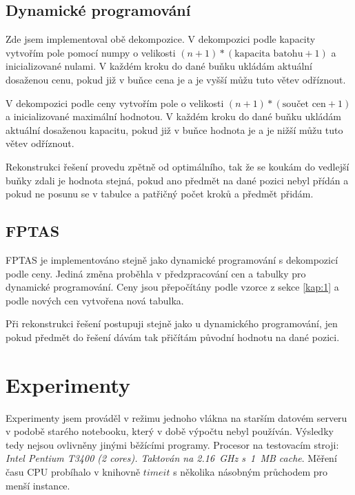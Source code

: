\documentclass[11pt]{article}
\begin{document}
\subsection{Dynamické programování}
Zde jsem implementoval obě dekompozice. V dekompozici podle kapacity vytvořím pole pomocí numpy o velikosti $(n+1)*(\text{kapacita batohu} + 1)$ a inicializované nulami. V každém kroku do dané buňku ukládám aktuální dosaženou cenu, pokud již v buňce cena je a je vyšší můžu tuto větev odříznout.

V dekompozici podle ceny vytvořím pole o velikosti $(n+1)*(\text{součet cen} + 1)$ a inicializované maximální hodnotou. V každém kroku do dané buňku ukládám aktuální dosaženou kapacitu, pokud již v buňce hodnota je a je nižší můžu tuto větev odříznout.

Rekonstrukci řešení provedu zpětně od optimálního, tak že se koukám do vedlejší buňky zdali je hodnota stejná, pokud ano předmět na dané pozici nebyl přídán a pokud ne posunu se v tabulce a patřičný počet kroků a předmět přidám.

\subsection{FPTAS}
FPTAS je implementováno stejně jako dynamické programování s dekompozicí podle ceny. Jediná změna proběhla v předzpracování cen a tabulky pro dynamické programování. Ceny jsou přepočítány podle vzorce z sekce \ref{kap:1} a podle nových cen vytvořena nová tabulka. 

Při rekonstrukci řešení postupuji stejně jako u dynamického programování, jen pokud předmět do řešení dávám tak přičítám původní hodnotu na dané pozici.

\section{Experimenty}
 
Experimenty jsem prováděl v režimu jednoho vlákna na starším datovém serveru v podobě starého notebooku, který v době výpočtu nebyl používán. Výsledky tedy nejsou ovlivněny jinými běžícími programy. Procesor na testovacím stroji: \textit{Intel Pentium T3400 (2 cores). Taktován na 2.16~GHz s~1~MB cache}.
Měření času CPU probíhalo v knihovně $timeit$ s několika násobným průchodem pro menší instance.
\end{document}
